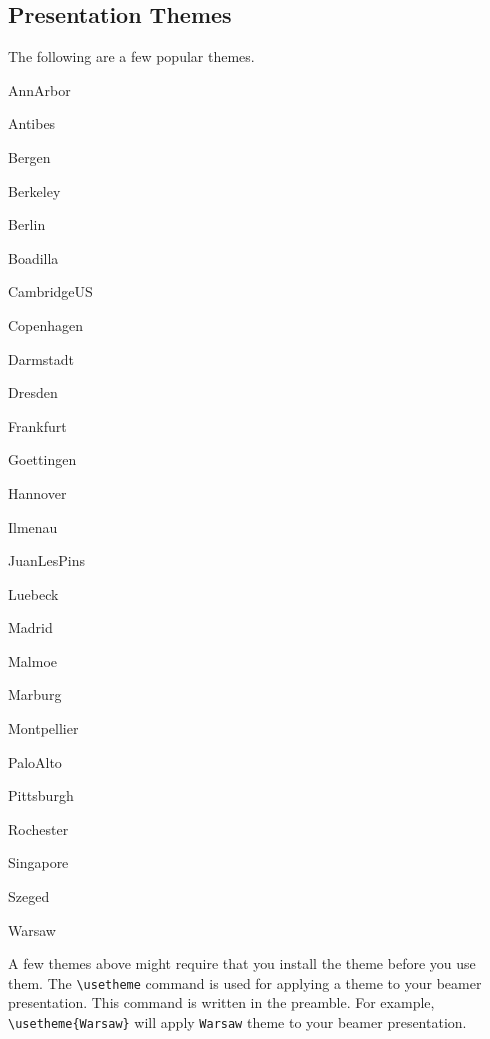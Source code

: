 \documentclass{article}
\begin{document}
\subsection{Presentation Themes}
The following are a few popular themes.
\begin{enumerate*}
	\item AnnArbor
	\item Antibes
	\item Bergen
	\item Berkeley
	\item Berlin
	\item Boadilla
	\item CambridgeUS
	\item Copenhagen
	\item Darmstadt
	\item Dresden
	\item Frankfurt
	\item Goettingen
	\item Hannover
	\item Ilmenau
	\item JuanLesPins
	\item Luebeck
	\item Madrid
	\item Malmoe
	\item Marburg
	\item Montpellier
	\item PaloAlto
	\item Pittsburgh
	\item Rochester
	\item Singapore
	\item Szeged
	\item Warsaw
\end{enumerate*}

A few themes above might require that you install the theme before you use them.
The \texttt{\textbackslash usetheme} command is used for applying a theme to your beamer presentation. This command is written in the preamble. For example, \texttt{\textbackslash usetheme\{Warsaw\}} will apply \texttt{Warsaw} theme to your beamer presentation. 
\end{document}
